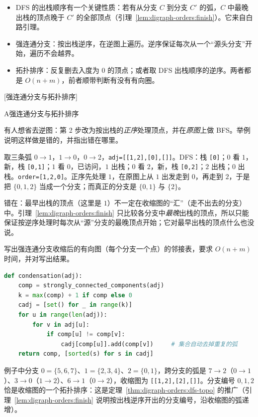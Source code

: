 \begin{itemize}
\item DFS 的出栈顺序有一个关键性质：若有从分支 $C$ 到分支 $C'$ 的弧，$C$ 中最晚出栈的顶点晚于 $C'$ 的全部顶点（引理~\ref{lem:digraph-orders:finish}）。它来自白路引理。
\item 强连通分支：按出栈逆序，在逆图上遍历。逆序保证每次从一个“源头分支”开始，遍历不会越界。
\item 拓扑排序：反复删去入度为 $0$ 的顶点；或者取 DFS 出栈顺序的逆序。两者都是 $O(n+m)$，前者顺带判断有没有有向圈。
\end{itemize}

[强连通分支与拓扑排序]


\begin{exercises}{A}{强连通分支与拓扑排序}
\item\label{ex:digraph-orders:A1} 有人想省去逆图：第 2 步改为按出栈的\emph{正序}处理顶点，并在\emph{原图}上做 BFS。举例说明这样做是错的，并指出错在哪里。
\begin{solution}
取三条弧 $0\to1$，$1\to0$，$0\to2$，\texttt{adj=[[1,2],[0],[]]}。DFS：栈 \texttt{[0]}；$0$ 看 $1$，新，栈 \texttt{[0,1]}；$1$ 看 $0$，已访问，$1$ 出栈；$0$ 看 $2$，新，栈 \texttt{[0,2]}；$2$ 出栈；$0$ 出栈。\texttt{order=[1,2,0]}。正序先处理 $1$，在原图上从 $1$ 出发走到 $0$，再走到 $2$，于是把 $\{0,1,2\}$ 当成一个分支；而真正的分支是 $\{0,1\}$ 与 $\{2\}$。

错在：最早出栈的顶点（这里是 $1$）不一定在收缩图的“汇”（走不出去的分支）中。引理~\ref{lem:digraph-orders:finish} 只比较各分支中\emph{最晚}出栈的顶点，所以只能保证按逆序处理时每次从“源”分支的最晚顶点开始；它对最早出栈的顶点什么也没说。
\end{solution}

\item\label{ex:digraph-orders:A2} 写出强连通分支收缩后的有向图（每个分支一个点）的邻接表，要求 $O(n+m)$ 时间，并对写出结果。
\begin{solution}
\begin{lstlisting}[language=Python]
def condensation(adj):
    comp = strongly_connected_components(adj)
    k = max(comp) + 1 if comp else 0
    cadj = [set() for _ in range(k)]
    for u in range(len(adj)):
        for v in adj[u]:
            if comp[u] != comp[v]:
                cadj[comp[u]].add(comp[v])     # 集合自动去掉重复的弧
    return comp, [sorted(s) for s in cadj]
\end{lstlisting}
例子中分支 $0=\{5,6,7\}$、$1=\{2,3,4\}$、$2=\{0,1\}$，跨分支的弧是 $7\to2$（$0\to1$）、$3\to0$（$1\to2$）、$6\to1$（$0\to2$），收缩图为 \texttt{[[1,2],[2],[]]}。分支编号 $0,1,2$ 恰是收缩图的一个拓扑排序：这是定理~\ref{thm:digraph-orders:dfs-topo} 的推广（引理~\ref{lem:digraph-orders:finish} 说明按出栈逆序开出的分支编号，沿收缩图的弧递增）。
\end{solution}


\end{exercises}
